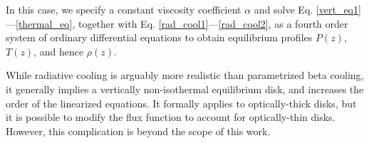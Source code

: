 In this case, we specify a constant viscosity coefficient $\alpha$ and
solve Eq. \ref{vert_eq1}---\ref{thermal_eq}, together with
Eq. \ref{rad_cool1}---\ref{rad_cool2}, as a fourth order system of
ordinary differential equations to obtain equilibrium profiles $P(z)$, $T(z)$, and hence
$\rho(z)$.  

While radiative cooling is arguably more realistic than
parametrized beta cooling, it generally implies a vertically
non-isothermal equilibrium disk, and increases the order of the
linearized equations. It formally applies to optically-thick 
disks, but it is possible to modify the flux function to account
for optically-thin disks. However, this complication is beyond the scope of
this work. 


